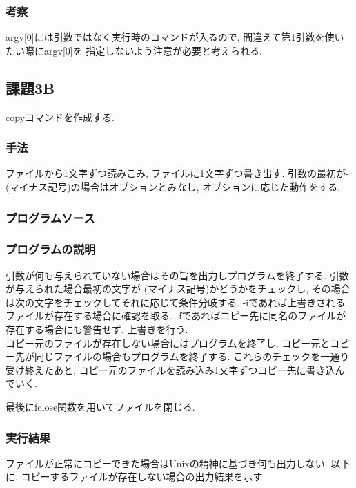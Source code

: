 \documentclass{jsarticle}
\begin{document}
            \subsubsection{考察}
                argv[0]には引数ではなく実行時のコマンドが入るので, 間違えて第1引数を使いたい際にargv[0]を
                指定しないよう注意が必要と考えられる. 

        \subsection{課題3B}
            copyコマンドを作成する. 
            \subsubsection{手法}
                ファイルから1文字ずつ読みこみ, ファイルに1文字ずつ書き出す. 
                引数の最初が-(マイナス記号)の場合はオプションとみなし, オプションに応じた動作をする. 

            \subsubsection{プログラムソース}
                
            
            \subsubsection{プログラムの説明}
                引数が何も与えられていない場合はその旨を出力しプログラムを終了する. 
                引数が与えられた場合最初の文字が-(マイナス記号)かどうかをチェックし, 
                その場合は次の文字をチェックしてそれに応じて条件分岐する. 
                -iであれば上書きされるファイルが存在する場合に確認を取る. 
                -fであればコピー先に同名のファイルが存在する場合にも警告せず, 上書きを行う. \\
                コピー元のファイルが存在しない場合にはプログラムを終了し, コピー元とコピー先が同じファイルの場合もプログラムを終了する. 
                これらのチェックを一通り受け終えたあと, コピー元のファイルを読み込み1文字ずつコピー先に書き込んでいく. 

                最後にfclose関数を用いてファイルを閉じる. 

            \subsubsection{実行結果}
                ファイルが正常にコピーできた場合はUnixの精神に基づき何も出力しない. 
                以下に, コピーするファイルが存在しない場合の出力結果を示す. 
                
\end{document}
